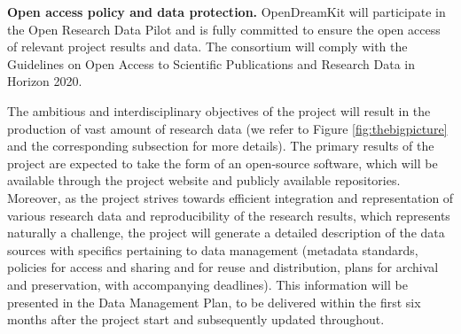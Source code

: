 

%
%
%
%
%
%
%
%

{\bf Open access policy and data protection.} OpenDreamKit will participate in the Open Research Data Pilot and is fully committed to ensure the open access of relevant project results and data. The consortium will comply with the Guidelines on Open Access to Scientific Publications and Research Data in Horizon 2020. 

The ambitious and interdisciplinary objectives of the project will result in the production of vast amount of research data (we refer to Figure \ref{fig:thebigpicture} and the corresponding subsection for more details). The primary results of the project are expected to take the form of an open-source software, which will be available through the project website and publicly available repositories. Moreover, as the project strives towards efficient integration and representation of various research data and reproducibility of the research results, which represents naturally a challenge, the project will generate a detailed description of the data sources with specifics pertaining to data management (metadata standards, policies for access and sharing and for reuse and distribution, plans for archival and preservation, with accompanying deadlines). This information will be presented in the Data Management Plan, to be delivered within the first six months after the project start and subsequently updated throughout. 

